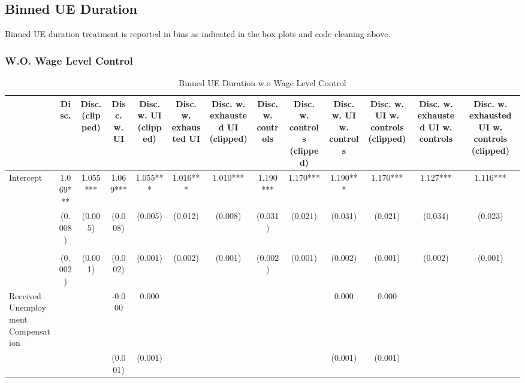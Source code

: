 \documentclass[
]{article}
\begin{document}
\subsection{Binned UE Duration}\label{binned-ue-duration}

Binned UE duration treatment is reported in bins as indicated in the box
plots and code cleaning above.

\subsubsection{W.O. Wage Level Control}\label{w.o.-wage-level-control-1}

\begin{table}[t]
\caption{\label{tab:unnamed-chunk-31}Binned UE Duration w.o Wage Level Control} 
\fontsize{12.0pt}{14.4pt}\selectfont
\begin{tabular*}{\linewidth}{@{\extracolsep{\fill}}lcccccccccccc}
\toprule
  & Disc. & Disc. (clipped) & Disc. w. UI & Disc. w. UI (clipped) & Disc. w. exhausted UI & Disc. w. exhausted UI (clipped) & Disc. w. controls & Disc. w. controls (clipped) & Disc. w. UI w. controls & Disc. w. UI w. controls (clipped) & Disc. w. exhausted UI w. controls & Disc. w. exhausted UI w. controls (clipped) \\ 
\midrule\addlinespace[2.5pt]
Intercept & 1.069*** & 1.055*** & 1.069*** & 1.055*** & 1.016*** & 1.010*** & 1.190*** & 1.170*** & 1.190*** & 1.170*** & 1.127*** & 1.116*** \\ 
 & (0.008) & (0.005) & (0.008) & (0.005) & (0.012) & (0.008) & (0.031) & (0.021) & (0.031) & (0.021) & (0.034) & (0.023) \\ 
{\cellcolor[HTML]{ADD8E6}{Unemployment Duration (Binned)}} & {\cellcolor[HTML]{ADD8E6}{-0.013***}} & {\cellcolor[HTML]{ADD8E6}{-0.009***}} & {\cellcolor[HTML]{ADD8E6}{-0.013***}} & {\cellcolor[HTML]{ADD8E6}{-0.009***}} & {\cellcolor[HTML]{ADD8E6}{-0.008***}} & {\cellcolor[HTML]{ADD8E6}{-0.005***}} & {\cellcolor[HTML]{ADD8E6}{-0.011***}} & {\cellcolor[HTML]{ADD8E6}{-0.008***}} & {\cellcolor[HTML]{ADD8E6}{-0.011***}} & {\cellcolor[HTML]{ADD8E6}{-0.008***}} & {\cellcolor[HTML]{ADD8E6}{-0.007***}} & {\cellcolor[HTML]{ADD8E6}{-0.005***}} \\ 
 & (0.002) & (0.001) & (0.002) & (0.001) & (0.002) & (0.001) & (0.002) & (0.001) & (0.002) & (0.001) & (0.002) & (0.001) \\ 
Received Unemployment Compensation &  &  & -0.000 & 0.000 &  &  &  &  & 0.000 & 0.000 &  &  \\ 
 &  &  & (0.001) & (0.001) &  &  &  &  & (0.001) & (0.001) &  &  \\ 

\end{tabular*}
\end{table}
\end{document}
